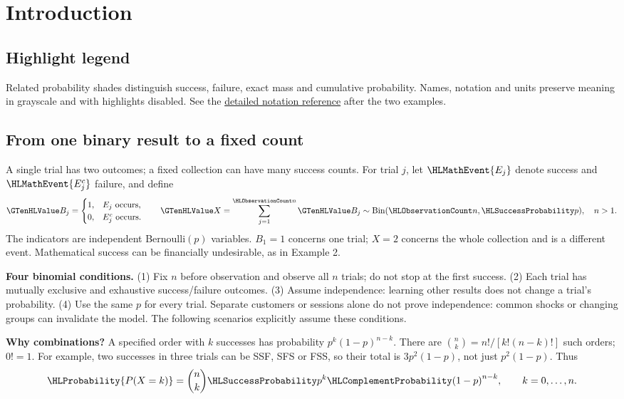 \clearpage
\section{Introduction}\label{sec:introduction}\label{sec:t2-c4-introduction}
\subsection*{Highlight legend}
\label{tab:highlight-legend}
Related probability shades distinguish success, failure, exact mass and cumulative probability.
Names, notation and units preserve meaning in grayscale and with highlights disabled.
See the \hyperref[tab:notation-reference]{detailed notation reference} after the two examples.

\subsection*{From one binary result to a fixed count}
A single trial has two outcomes; a fixed collection can have many success counts.
For trial $j$, let $\HLMathEvent{E_j}$ denote success and $\HLMathEvent{E_j^c}$ failure, and define
\[
\Indicator{B_j}=\begin{cases}1,&E_j\text{ occurs},\\0,&E_j^c\text{ occurs}.\end{cases}
\qquad
\Count{X}=\sum_{j=1}^{\TrialCount{n}}\Indicator{B_j}\sim\operatorname{Bin}(\TrialCount{n},\SuccessProb{p}),\quad n>1.
\]
The indicators are independent Bernoulli$(p)$ variables. $B_1=1$ concerns one trial;
$X=2$ concerns the whole collection and is a different event.
Mathematical success can be financially undesirable, as in Example 2.

\textbf{Four binomial conditions.} (1) Fix $n$ before observation and observe all $n$ trials;
do not stop at the first success. (2) Each trial has mutually exclusive and exhaustive success/failure outcomes.
(3) Assume independence: learning other results does not change a trial's probability.
(4) Use the same $p$ for every trial. Separate customers or sessions alone do not prove independence:
common shocks or changing groups can invalidate the model. The following scenarios explicitly assume these conditions.

\textbf{Why combinations?} A specified order with $k$ successes has probability $p^k(1-p)^{n-k}$.
There are $\binom nk=n!/[k!(n-k)!]$ such orders; $0!=1$.
For example, two successes in three trials can be SSF, SFS or FSS, so their total is
$3p^2(1-p)$, not just $p^2(1-p)$. Thus
\[
\HLProbability{P(X=k)}=\binom nk\SuccessProb{p}^{k}\FailureProb{(1-p)}^{n-k},\qquad k=0,\ldots,n.
\]
\clearpage
